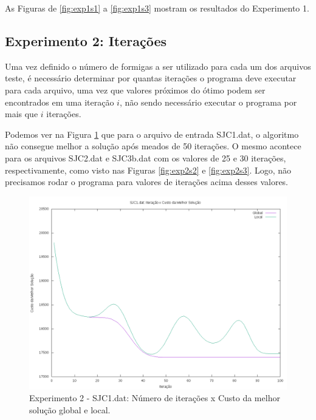 \documentclass[12pt]{article}
\begin{document}
As Figuras de \ref{fig:exp1s1} a \ref{fig:exp1s3} mostram os resultados do Experimento 1.

\subsection{Experimento 2: Iterações}

Uma vez definido o número de formigas a ser utilizado para cada um dos arquivos teste, é necessário
determinar por quantas iterações o programa deve executar para cada arquivo, uma vez que valores próximos
do ótimo podem ser encontrados em uma iteração $ i $, não sendo necessário executar o programa por mais
que $ i $ iterações.

Podemos ver na Figura \ref{fig:exp2s1} que para o arquivo de entrada SJC1.dat, o algoritmo não
consegue melhor a solução após meados de 50 iterações. O mesmo acontece para os arquivos
SJC2.dat e SJC3b.dat com os valores de 25 e 30 iterações, respectivamente, como visto nas
Figuras \ref{fig:exp2s2} e \ref{fig:exp2s3}. Logo, não
precisamos rodar o programa para valores de iterações acima desses valores.

\begin{figure}[!htbp]
  \centering
  \includegraphics[width=1\textwidth]{exp2s1.png}
  \caption{Experimento 2 - SJC1.dat: Número de iterações x Custo da melhor solução global e local.}
  \label{fig:exp2s1}
\end{figure}
\end{document}
